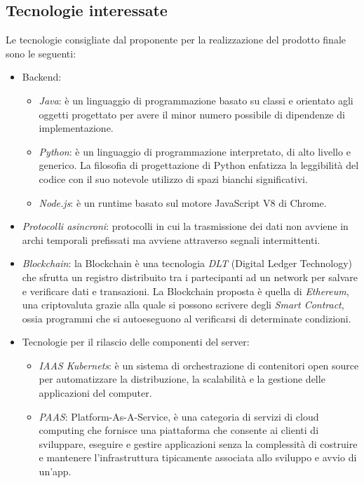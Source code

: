 \subsection{Tecnologie interessate}
Le tecnologie consigliate dal proponente per la realizzazione del prodotto finale sono le seguenti:
\begin{itemize}
	\item Backend:
	      \begin{itemize}
		      \item \textit{Java}: è un linguaggio di programmazione basato su classi e orientato agli oggetti progettato per avere il minor numero possibile di dipendenze di implementazione.
		      \item \textit{Python}: è un linguaggio di programmazione interpretato, di alto livello e generico. La filosofia di progettazione di Python enfatizza la leggibilità del codice con il suo notevole utilizzo di spazi bianchi significativi.
		      \item \textit{Node.js}: è un runtime  basato sul motore JavaScript V8 di Chrome.
	      \end{itemize}
	\item \textit{Protocolli asincroni}: protocolli in cui la trasmissione dei dati non avviene in archi temporali prefissati ma avviene attraverso segnali intermittenti.
	\item \textit{Blockchain}: la Blockchain è una tecnologia \textit{DLT} (Digital Ledger Technology) che sfrutta un registro distribuito tra i partecipanti ad un network per salvare e verificare dati e transazioni. La Blockchain proposta è quella di \textit{Ethereum}, una criptovaluta grazie alla quale si possono scrivere degli \textit{Smart Contract}, ossia programmi che si autoeseguono al verificarsi di determinate condizioni.
	\item Tecnologie per il rilascio delle componenti del server:
	      \begin{itemize}
		      \item \textit{IAAS Kubernets}: è un sistema di orchestrazione di contenitori open source per automatizzare la distribuzione, la scalabilità e la gestione delle applicazioni del computer.
		      \item \textit{PAAS}: Platform-As-A-Service, è una categoria di servizi di cloud computing che fornisce una piattaforma che consente ai clienti di sviluppare, eseguire e gestire applicazioni senza la complessità di costruire e mantenere l'infrastruttura tipicamente associata allo sviluppo e avvio di un'app.
	      \end{itemize}
\end{itemize}

